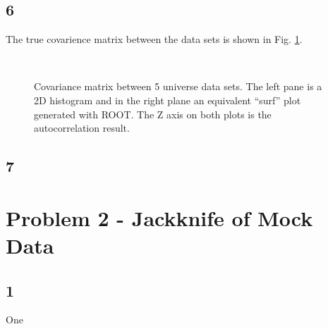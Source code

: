 \documentclass[singlepage,notitlepage,nofootinbib,11pt]{revtex4-1}
\begin{document}
\subsection{6}
The true covarience matrix between the data sets is shown in Fig. \ref{comatrix}.
\begin{figure}
\centering
  \captionsetup[subfigure]{labelformat=empty}
  \\
\hfill
\caption{\label{comatrix} Covariance matrix between 5 universe data sets. The left pane is a 2D histogram and in the right plane an equivalent ``surf'' plot generated with ROOT. The Z axis on both plots is the autocorrelation result.}
\end{figure}
\clearpage
\subsection{7}

\section{Problem 2 - Jackknife of Mock Data}
\subsection{1}
One
\end{document}
